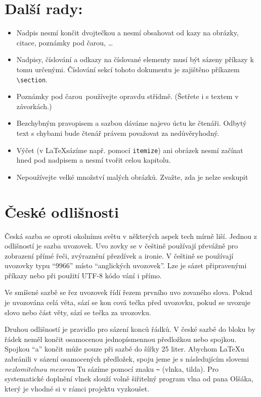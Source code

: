 \documentclass[twocolumn, 10pt, a4paper]{article}
\begin{document}
\section{Další rady:}
\begin{itemize}[left=0pt, label=•]
    \item Nadpis nesmí končit dvojtečkou a nesmí obsahovat od\-
        kazy na obrázky, citace, poznámky pod čarou, \ldots
    \item Nadpisy, číslování a odkazy na číslované elementy musí
        být sázeny příkazy k tomu určenými. Číslování sekcí
        tohoto dokumentu je zajištěno příkazem \verb|\section|.
\pagebreak
    \item
        Poznámky pod čarou\footnotemark~používejte opravdu střídmě.
        (Šetřete i s textem v závorkách.)
    \item
        Bezchybným pravopisem a sazbou dáváme najevo úctu
        ke čtenáři. Odbytý text s chybami bude čtenář právem
        považovat za nedůvěryhodný.
    \item
        Výčet (v \LaTeX sázíme např. pomocí \texttt{itemize}) ani
        obrázek nesmí začínat hned pod nadpisem a nesmí
        tvořit celou kapitolu.
    \item
        Nepoužívejte velké množství malých obrázků. Zvažte,
        zda je nelze seskupit
\end{itemize}
\section{České odlišnosti}
    Česká sazba se oproti okolnímu světu v některých aspek\-
    tech mírně liší. Jednou z odlišností je sazba uvozovek. Uvo\-
    zovky se v češtině používají převážně pro zobrazení přímé
    řeči, zvýraznění přezdívek a ironie. V češtině se používají
    uvozovky typu \enquote{9966} místo “anglických uvozovek”. Lze je
    sázet připravenými příkazy nebo při použití UTF-8 kódo\-
    vání i přímo.

    Ve smíšené sazbě se řez uvozovek řídí řezem prvního uvo\-
    zovaného slova. Pokud je uvozována celá věta, sází se kon\-
    cová tečka před uvozovku, pokud se uvozuje slovo nebo část
    věty, sází se tečka za uvozovku.

    Druhou odlišností je pravidlo pro sázení konců řádků.
    V české sazbě do bloku by řádek neměl končit osamocenou
    jednopísmennou předložkou nebo spojkou. \mbox{Spojkou}
    \enquote{a} končit může pouze při sazbě do šířky 25 liter. Abychom
    \LaTeX u zabránili v sázení osamocených předložek, spoju\-
    jeme je s následujícím slovemi \textit{nezlomitelnou mezerou} Tu
    sázíme pomocí znaku \verb|~| (vlnka, tilda). Pro systematické
    doplnění vlnek slouží volně šiřitelný program vlna od pana
    Olšáka\footnotemark, který je vhodné si v rámci projektu vyzkoušet.
\end{document}
